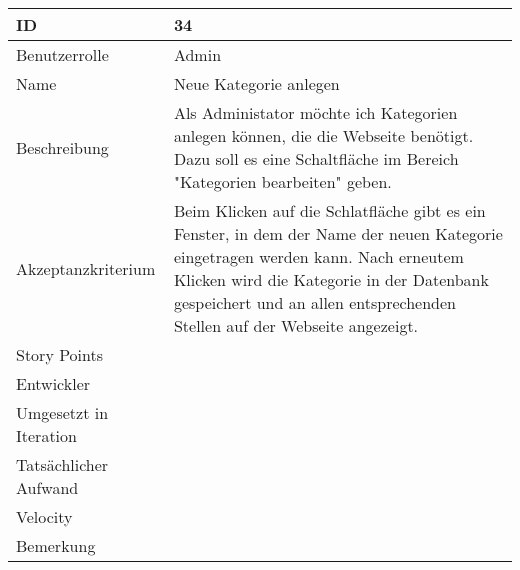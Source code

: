 \begin{tabularx}{\textwidth}{|p{}|X|}
	\hline
	ID & 34\\
	\hline
	Benutzerrolle & Admin\\
	\hline
	Name & Neue Kategorie anlegen\\
	\hline
	Beschreibung & Als Administator möchte ich Kategorien anlegen können, die die Webseite benötigt. Dazu soll es eine Schaltfläche im Bereich "Kategorien bearbeiten" geben.\\
	\hline
	Akzeptanzkriterium & Beim Klicken auf die Schlatfläche gibt es ein Fenster, in dem der Name der neuen Kategorie eingetragen werden kann. Nach erneutem Klicken wird die Kategorie in der Datenbank gespeichert und an allen entsprechenden Stellen auf der Webseite angezeigt.\\
	\hline
	Story Points & \\
	\hline
	Entwickler & \\
	\hline
	Umgesetzt in Iteration & \\
	\hline
	Tatsächlicher Aufwand & \\
	\hline
	Velocity & \\
	\hline
	Bemerkung & \\
	\hline
\end{tabularx}
\vspace{20pt}
